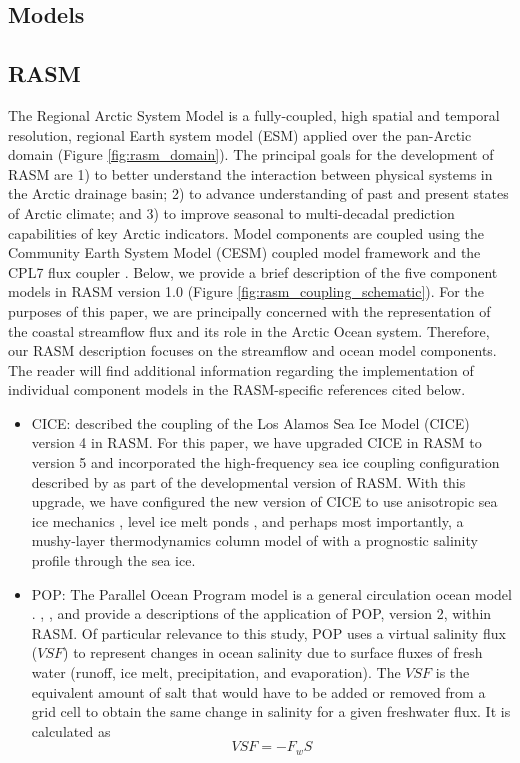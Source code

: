 \documentclass[jgrga, draft]{agutex}
\begin{document}
\begin{article}
\section{Models}
\label{sec:models}

\subsection{RASM}
\label{sec:rasm}
The Regional Arctic System Model is a fully-coupled, high spatial and temporal resolution, regional Earth system model (ESM) applied over the pan-Arctic domain (Figure \ref{fig:rasm_domain}).
The principal goals for the development of RASM are 1) to better understand the interaction between physical systems in the Arctic drainage basin; 2) to advance understanding of past and present states of Arctic climate; and 3) to improve seasonal to multi-decadal prediction capabilities of key Arctic indicators.
Model components are coupled using the Community Earth System Model (CESM) coupled model framework and the CPL7 flux coupler \citep{Craig_2011}. %
Below, we provide a brief description of the five component models in RASM version 1.0 (Figure \ref{fig:rasm_coupling_schematic}).
For the purposes of this paper, we are principally concerned with the representation of the coastal streamflow flux and its role in the Arctic Ocean system.
Therefore, our RASM description focuses on the streamflow and ocean model components.
The reader will find additional information regarding the implementation of individual component models in the RASM-specific references cited below.

\begin{itemize}[leftmargin=+.5in]
\item CICE: \citet{Roberts_2015a} described the coupling of the Los Alamos Sea Ice Model (CICE) version 4 in RASM.
For this paper, we have upgraded CICE in RASM to version 5 \citep{Hunke2015} and incorporated the high-frequency sea ice coupling configuration described by \citet{Roberts_2015a} as part of the developmental version of RASM.
With this upgrade, we have configured the new version of CICE to use anisotropic sea ice mechanics \citep{Tsamados2013}, level ice melt ponds \citep{Hunke2013}, and perhaps most importantly, a mushy-layer thermodynamics column model of \citet{Turner2015} with a prognostic salinity profile through the sea ice.
\item POP: The Parallel Ocean Program model is a general circulation ocean model \citep{Smith_2010}.
\citet{Maslowski_2012}, \citet{Roberts_2015a}, and \citet{Osinski_2016} provide a descriptions of the application of POP, version 2, within RASM.
Of particular relevance to this study, POP uses a virtual salinity flux ($VSF$) to represent changes in ocean salinity due to surface fluxes of fresh water (runoff, ice melt, precipitation, and evaporation).
The $VSF$ is the equivalent amount of salt that would have to be added or removed from a grid cell to obtain the same change in salinity for a given freshwater flux.
It is calculated as
\begin{equation}
  \label{eq:SaltFlux}
  VSF=-F_w S
\end{equation}


\end{itemize}
\end{article}
\end{document}
